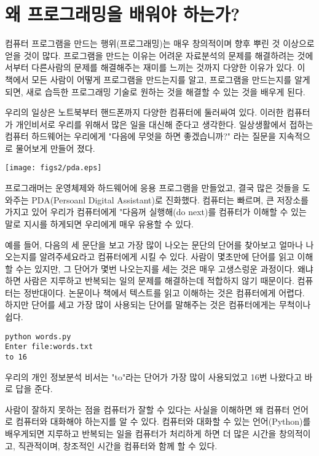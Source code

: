 
\chapter{왜 프로그래밍을 배워야 하는가?}

컴퓨터 프로그램을 만드는 행위(프로그래밍)는 매우 창의적이며 향후 뿌린 것 이상으로 얻을 것이 많다. 프로그램을 만드는 이유는 어려운 자료분석의 문제를 해결하려는 것에서부터 다른사람의 문제를 해결해주는 재미를 느끼는 것까지 다양한 이유가 있다. 이 책에서 모든 사람이 어떻게 프로그램을 만드는지를 알고, 프로그램을 만드는지를 알게되면, 새로 습득한 프로그래밍 기술로 원하는 것을 해결할 수 있는 것을 배우게 된다.

우리의 일상은 노트북부터 핸드폰까지 다양한 컴퓨터에 둘러싸여 있다. 이러한 컴퓨터가 개인비서로 우리를 위해서 많은 일을 대신해 준다고 생각한다. 일상생활에서 접하는 컴퓨터 하드웨어는 우리에게 "다음에 무엇을 하면 좋겠습니까?" 라는 질문을 지속적으로 물어보게 만들어 졌다.


 
\beforefig
\centerline{\texttt{[image: figs2/pda.eps]}}
\afterfig

프로그래머는 운영체제와 하드웨어에 응용 프로그램을 만들었고, 결국 많은 것들을 도와주는 PDA(Persoanl Digital Assistant)로 진화했다. 컴퓨터는 빠르며, 큰 저장소를 가지고 있어 우리가 컴퓨터에게 "다음꺼 실행해(do next)를 컴퓨터가 이해할 수 있는 말로 지시를 하게되면 우리에게 매우 유용할 수 있다.

예를 들어, 다음의 세 문단을 보고 가장 많이 나오는 문단의 단어를 찾아보고 얼마나 나오는지를 알려주세요라고 컴퓨터에게 시킬 수 있다. 사람이 몇초만에 단어를 읽고 이해할 수는 있지만, 그 단어가 몇번 나오는지를 세는 것은 매우 고생스렁운 과정이다. 왜냐하면 사람은 지루하고 반복되는 일의 문제를 해결하는데 적합하지 않기 때문이다. 컴퓨터는 정반대이다. 논문이나 책에서 텍스트를 읽고 이해하는 것은 컴퓨터에게 어렵다. 하지만 단어를 세고 가장 많이 사용되는 단어를 말해주는 것은 컴퓨터에게는 무척이나 쉽다.

\beforeverb
\begin{verbatim}
python words.py
Enter file:words.txt
to 16
\end{verbatim}
\afterverb
%
우리의 개인 정보분석 비서는 "to"라는 단어가 가장 많이 사용되었고 16번 나왔다고 바로 답을 준다.

사람이 잘하지 못하는 점을 컴퓨터가 잘할 수 있다는 사실을 이해하면 왜 컴퓨터 언어로 컴퓨터와 대화해야 하는지를 알 수 있다. 컴퓨터와 대화할 수 있는 언어(Python)를 배우게되면 지루하고 반복되는 일을 컴퓨터가 처리하게 하면 더 많은 시간을 창의적이고, 직관적이며, 창조적인 시간을 컴퓨터와 함께 할 수 있다. 

